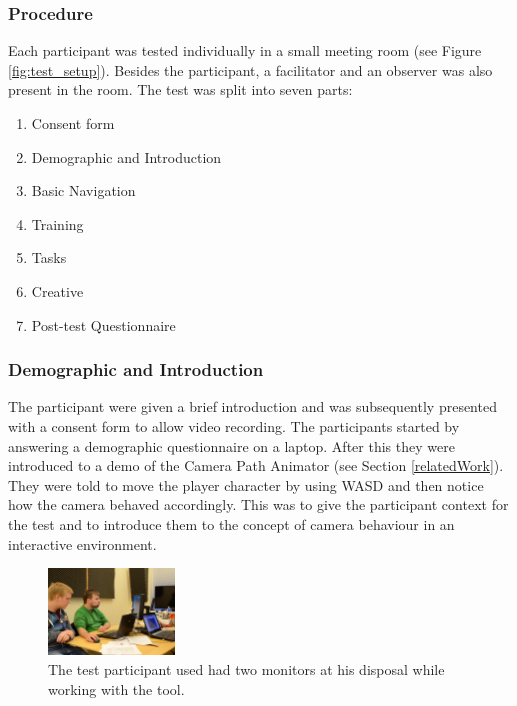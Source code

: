 \subsubsection{Procedure}
Each participant was tested individually in a small meeting room (see Figure \ref{fig:test_setup}). Besides the participant, a facilitator and an observer was also present in the room. The test was split into seven parts:

\begin{enumerate}
\item Consent form
\item Demographic and Introduction
\item Basic Navigation
\item Training
\item Tasks
\item Creative
\item Post-test Questionnaire
\end{enumerate} 

\subsubsection{Demographic and Introduction}
The participant were given a brief introduction and was subsequently presented with a consent form to allow video recording. The participants started by answering a demographic questionnaire on a laptop. After this they were introduced to a demo of the Camera Path Animator (see Section \ref{relatedWork}). They were told to move the player character by using WASD and then notice how the camera behaved accordingly. This was to give the participant context for the test and to introduce them to the concept of camera behaviour in an interactive environment. 

\begin{figure}[htbp]
\centering
\includegraphics[width=0.3\textwidth]{Pics/test_setup}
\caption{The test participant used had two monitors at his disposal while working with the tool.}
\label{fig:framingConcept}
\end{figure}

